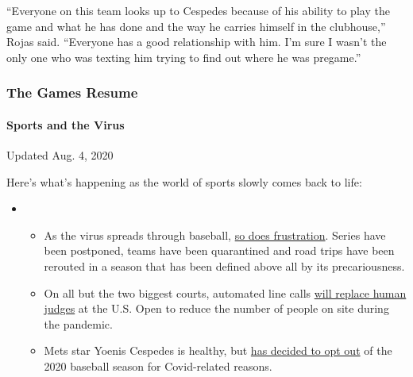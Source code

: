 ``Everyone on this team looks up to Cespedes because of his ability to
play the game and what he has done and the way he carries himself in the
clubhouse,'' Rojas said. ``Everyone has a good relationship with him.
I'm sure I wasn't the only one who was texting him trying to find out
where he was pregame.''

\hypertarget{the-games-resume}{%
\subsubsection{The Games Resume}\label{the-games-resume}}

\hypertarget{sports-and-the-virus}{%
\paragraph{Sports and the Virus}\label{sports-and-the-virus}}

Updated Aug. 4, 2020

Here's what's happening as the world of sports slowly comes back to
life:

\begin{itemize}
\item
  \begin{itemize}
  \tightlist
  \item
    As the virus spreads through baseball,
    \href{https://www.nytimes3xbfgragh.onion/2020/08/03/sports/baseball/mlb-coronavirus-outbreak.html?action=click\&pgtype=Article\&state=default\&region=MAIN_CONTENT_2\&context=storylines_keepup}{so
    does frustration}. Series have been postponed, teams have been
    quarantined and road trips have been rerouted in a season that has
    been defined above all by its precariousness.
  \item
    On all but the two biggest courts, automated line calls
    \href{https://www.nytimes3xbfgragh.onion/2020/08/03/sports/tennis/us-open-hawkeye-line-judges.html?action=click\&pgtype=Article\&state=default\&region=MAIN_CONTENT_2\&context=storylines_keepup}{will
    replace human judges} at the U.S. Open to reduce the number of
    people on site during the pandemic.
  \item
    Mets star Yoenis Cespedes is healthy, but
    \href{https://www.nytimes3xbfgragh.onion/2020/08/02/sports/baseball/Yoenis-cespedes-opt-out-rule.html?action=click\&pgtype=Article\&state=default\&region=MAIN_CONTENT_2\&context=storylines_keepup}{has
    decided to opt out} of the 2020 baseball season for Covid-related
    reasons.
  \end{itemize}
\end{itemize}

